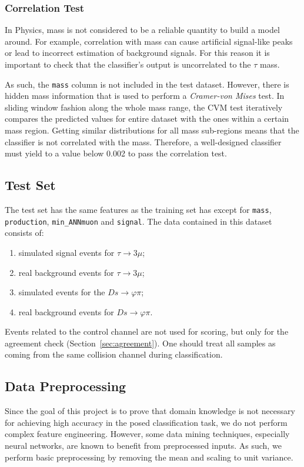 \documentclass[conference]{IEEEtran}
\begin{document}
\subsubsection{Correlation Test}
\label{sec:correlation}
In Physics, mass is not considered to be a reliable quantity to build a model around. For example, correlation with mass can cause artificial signal-like peaks or lead to incorrect estimation of background signals. For this reason it is important to check that the classifier's output is uncorrelated to the $\tau$ mass.

As such, the \texttt{mass} column is not included in the test dataset. However, there is hidden mass information that is used to perform a \textit{Cramer-von Mises} test. In sliding window fashion along the whole mass range, the CVM test iteratively compares the predicted values for entire dataset with the ones within a certain mass region. Getting similar distributions for all mass sub-regions means that the classifier is not correlated with the mass. Therefore, a well-designed classifier must yield to a value below 0.002 to pass the correlation test.

\subsection{Test Set}
\label{sec:test-set}
The test set has the same features as the training set has except for
\texttt{mass}, \texttt{production}, \texttt{min\_ANNmuon} and \texttt{signal}.
The data contained in this dataset consists of:
\begin{enumerate}
	\item simulated signal events for $\tau \rightarrow 3\mu$;
	\item real background events for $\tau \rightarrow 3\mu$;
	\item simulated events for the $Ds \rightarrow \varphi\pi$;
	\item real background events for $Ds \rightarrow \varphi\pi$.
\end{enumerate}

Events related to the control channel are not used for scoring, but only for the
agreement check (Section~\ref{sec:agreement}). One should treat all samples as
coming from the same collision channel during classification.

\subsection{Data Preprocessing}
Since the goal of this project is to prove that domain knowledge is not necessary for achieving high accuracy in the posed classification task, we do not perform complex feature engineering. However, some data mining techniques, especially neural networks, are known to benefit from preprocessed inputs. As such, we perform basic preprocessing by removing the mean and scaling to unit variance.
\end{document}
